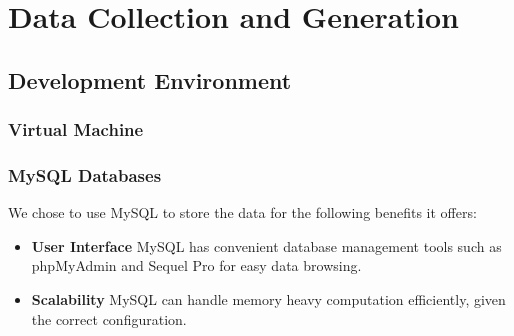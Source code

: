 \chapter{Data Collection and Generation}
\label{ch:data_generation}


\section{Development Environment}
\subsection{Virtual Machine}

\subsection{MySQL Databases}
\par We chose to use MySQL to store the data for the following benefits it offers:

\begin{itemize}
  \item \textbf{User Interface} MySQL has convenient database management tools such as phpMyAdmin\cite{phpmyadmin} and Sequel Pro\cite{sequel_pro} for easy data browsing.
  \item \textbf{Scalability} MySQL can handle memory heavy computation efficiently, given the correct configuration.
\end{itemize}




